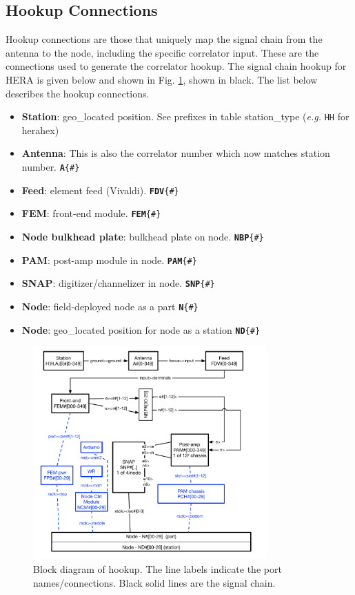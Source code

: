 \documentclass{article}
\begin{document}
\subsection{Hookup Connections}
Hookup connections are those that uniquely map the signal chain from the antenna to the node, including the specific correlator input.   These are the connections used to generate the correlator hookup.
The signal chain hookup for HERA is given below and shown in Fig. \ref{fig:hookup}, shown in black.  The list below describes the hookup connections.
\begin{itemize}\setlength\itemsep{-.3em}
	\item {\bf Station}: geo\_located position.  See prefixes in table station\_type ({\em e.g.} {\tt HH} for herahex)
	\item {\bf Antenna}:  This is also the correlator number which now matches station number.  {\tt{\bf A}\{\#\}}
	\item {\bf Feed}:  element feed (Vivaldi).  {\tt {\bf FDV}\{\#\}}
	\item {\bf FEM}:  front-end module. {\tt {\bf FEM}\{\#\}}
	\item {\bf Node bulkhead plate}:  bulkhead plate on node.  {\tt {\bf NBP}\{\#\}}
	\item {\bf PAM}:  post-amp module in node. {\tt {\bf PAM}\{\#\}}
	\item {\bf SNAP}:  digitizer/channelizer in node. {\tt {\bf SNP}\{\#\}}
	\item {\bf Node}: field-deployed node as a part {\tt {\bf N}\{\#\}}
	\item {\bf Node}:  geo\_located position for node as a station {\tt {\bf ND}\{\#\}}
\end{itemize}

\begin{figure}[H]
\includegraphics[width=0.8\textwidth]{hookup.pdf}
\centering
\caption{Block diagram of hookup.  The line labels indicate the port names/connections.  Black solid lines are the signal chain.}
\label{fig:hookup}
\end{figure}
\end{document}
